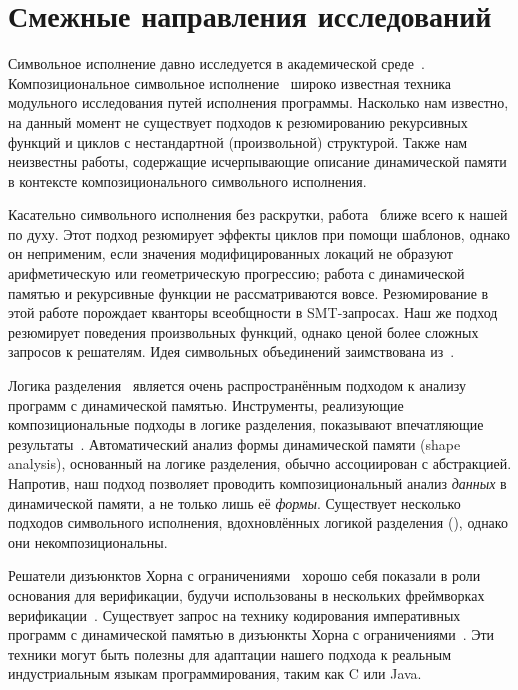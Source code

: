 \section{Смежные направления исследований}
\label{sec:related}

Символьное исполнение давно исследуется в академической среде~\cite{SurveySymExec-CSUR18}. Композициональное символьное исполнение~\cite{christakis2015ic,godefroid2007compositional,lin2016compositional} широко известная техника модульного исследования путей исполнения программы. Насколько нам известно, на данный момент не существует подходов к резюмированию рекурсивных функций и циклов с нестандартной (произвольной) структурой. Также нам неизвестны работы, содержащие исчерпывающие описание динамической памяти в контексте композиционального символьного исполнения. 

Касательно символьного исполнения без раскрутки, работа~\cite{slaby2013compact} ближе всего к нашей по духу. Этот подход резюмирует эффекты циклов при помощи шаблонов, однако он неприменим, если значения модифицированных локаций не образуют арифметическую или геометрическую прогрессию; работа с динамической памятью и рекурсивные функции не рассматриваются вовсе. Резюмирование в этой работе порождает кванторы всеобщности в SMT-запросах. Наш же подход резюмирует поведения произвольных функций, однако ценой более сложных запросов к решателям.
Идея символьных объединений заимствована из~\cite{torlak2014lightweight}.

Логика разделения~\cite{reynolds2002separation} является очень распространённым подходом к анализу программ с динамической памятью. Инструменты, реализующие композициональные подходы в логике разделения, показывают впечатляющие результаты~\cite{calcagno2011compositional,distefano2008jstar,calcagno2011infer}. Автоматический анализ формы динамической памяти (shape analysis), основанный на логике разделения, обычно ассоциирован с абстракцией. Напротив, наш подход позволяет проводить композициональный анализ \emph{данных} в динамической памяти, а не только лишь её \emph{формы}. Существует несколько подходов символьного исполнения, вдохновлённых логикой разделения (\cite{berdine2007shape,dudka2013byte,berdine2005symbolic}), однако они некомпозициональны.

Решатели дизъюнктов Хорна с ограничениями~\cite{grebenshchikov2012hsf,fedyukovich2017sampling,hoder2012generalized,hojjat2012verification,kafle2016solving,komuravelli2016smt,mcmillan2013computing,zhu2018data,albarghouthi2017probabilistic} хорошо себя показали в роли основания для верификации, будучи использованы в нескольких фреймворках верификации~\cite{gurfinkel2015seahorn,kahsai2016jayhorn,hojjat2012verification}. Существует запрос на технику кодирования императивных программ с динамической памятью в дизъюнкты Хорна с ограничениями~\cite{gurfinkel2017context,kahsai2017quantified}. Эти техники могут быть полезны для адаптации нашего подхода к реальным индустриальным языкам программирования, таким как C или Java.

